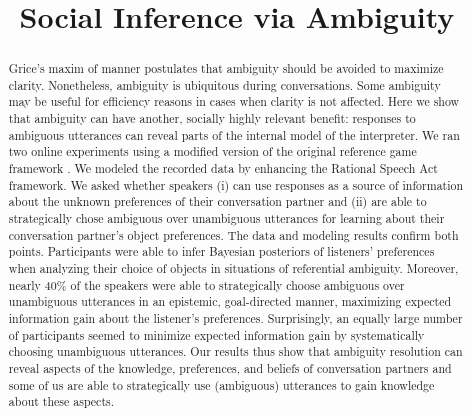 \documentclass[10pt,a4paper]{article}
\title{Social Inference via Ambiguity}
\begin{document}
\maketitle

\begin{abstract}
Grice's maxim of manner postulates that ambiguity should be avoided to maximize clarity.
Nonetheless, ambiguity is ubiquitous during conversations.
Some ambiguity may be useful for efficiency reasons in cases when clarity is not affected.
Here we show that ambiguity can have another, socially highly relevant benefit:
responses to ambiguous utterances can reveal parts of the internal model of the interpreter.
We ran two online experiments using a modified version of the original reference game framework \cite{frankgoodman2012}. We modeled the recorded data by enhancing the Rational Speech Act framework.
We asked whether speakers (i) can use responses as a source of information about the unknown preferences of their conversation partner and (ii) are able to strategically chose ambiguous over unambiguous utterances for learning about their conversation partner's object preferences. 
The data and modeling results confirm both points. 
Participants were able to infer Bayesian posteriors of listeners' preferences when analyzing their choice of objects in situations of referential ambiguity.
Moreover, nearly 40\% of the speakers were able to strategically choose ambiguous over unambiguous utterances in an epistemic, goal-directed manner, maximizing expected information gain about the listener's preferences.
Surprisingly, an equally large number of participants seemed to minimize expected information gain by systematically choosing unambiguous utterances. 
Our results thus show that ambiguity resolution can reveal aspects of the knowledge, preferences, and beliefs of conversation partners and some of us are able to strategically use (ambiguous) utterances to gain knowledge about these aspects.

\end{abstract}
\end{document}
